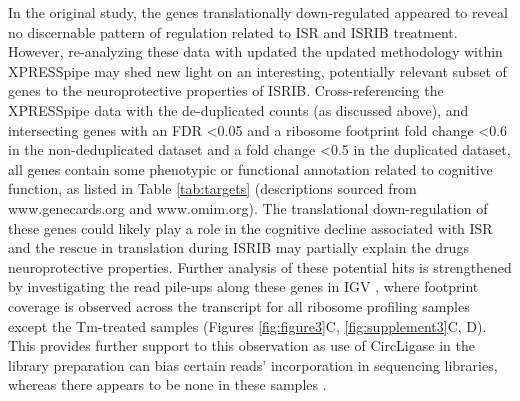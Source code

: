 \documentclass[11pt, a4paper, oneside]{article}
\begin{document}
In the original study, the genes translationally down-regulated appeared to reveal no discernable pattern of regulation related to ISR and ISRIB treatment. However, re-analyzing these data with updated the updated methodology within XPRESSpipe may shed new light on an interesting, potentially relevant subset of genes to the neuroprotective properties of ISRIB. Cross-referencing the XPRESSpipe data with the de-duplicated counts (as discussed above), and intersecting genes with an FDR \textless 0.05 and a ribosome footprint fold change \textless 0.6 in the non-deduplicated dataset and a fold change \textless 0.5 in the duplicated dataset, all genes contain some phenotypic or functional annotation related to cognitive function, as listed in Table \ref{tab:targets} (descriptions sourced from www.genecards.org and www.omim.org). The translational down-regulation of these genes could likely play a role in the cognitive decline associated with ISR and the rescue in translation during ISRIB may partially explain the drugs neuroprotective properties. Further analysis of these potential hits is strengthened by investigating the read pile-ups along these genes in IGV \cite{igv}, where footprint coverage is observed across the transcript for all ribosome profiling samples except the Tm-treated samples (Figures \ref{fig:figure3}C, \ref{fig:supplement3}C, D). This provides further support to this observation as use of CircLigase in the library preparation can bias certain reads' incorporation in sequencing libraries, whereas there appears to be none in these samples \cite{circligase_bias}.
\end{document}
